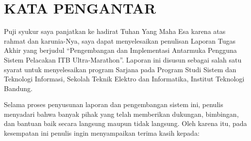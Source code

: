 \chapter*{KATA PENGANTAR}

Puji syukur saya panjatkan ke hadirat Tuhan Yang Maha Esa karena atas rahmat dan karunia-Nya, saya dapat menyelesaikan penulisan Laporan Tugas Akhir yang berjudul ``Pengembangan dan Implementasi Antarmuka Pengguna Sistem Pelacakan ITB Ultra-Marathon''. Laporan ini disusun sebagai salah satu syarat untuk menyelesaikan program Sarjana pada Program Studi Sistem dan Teknologi Informasi, Sekolah Teknik Elektro dan Informatika, Institut Teknologi Bandung.

Selama proses penyusunan laporan dan pengembangan sistem ini, penulis menyadari bahwa banyak pihak yang telah memberikan dukungan, bimbingan, dan bantuan baik secara langsung maupun tidak langsung. Oleh karena itu, pada kesempatan ini penulis ingin menyampaikan terima kasih kepada:

